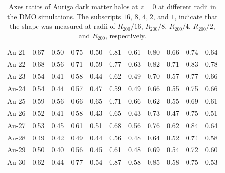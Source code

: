 \documentclass[usenatbib]{mnras}
\begin{document}
\begin{table}
\begin{tabular}{c c c c c c c c c c c}
Au-21 & 0.67 & 0.50 & 0.75 & 0.50 & 0.81 & 0.61 & 0.80 & 0.66 & 0.74 & 0.64\\
Au-22 & 0.68 & 0.56 & 0.71 & 0.59 & 0.77 & 0.63 & 0.82 & 0.71 & 0.83 & 0.78\\
Au-23 & 0.54 & 0.41 & 0.58 & 0.44 & 0.62 & 0.49 & 0.70 & 0.57 & 0.77 & 0.66\\
Au-24 & 0.54 & 0.44 & 0.57 & 0.47 & 0.59 & 0.49 & 0.66 & 0.55 & 0.75 & 0.66\\
Au-25 & 0.59 & 0.56 & 0.66 & 0.65 & 0.71 & 0.66 & 0.62 & 0.55 & 0.69 & 0.61\\
Au-26 & 0.52 & 0.41 & 0.58 & 0.43 & 0.65 & 0.43 & 0.73 & 0.47 & 0.75 & 0.51\\
Au-27 & 0.53 & 0.45 & 0.61 & 0.51 & 0.68 & 0.56 & 0.76 & 0.62 & 0.84 & 0.64\\
Au-28 & 0.49 & 0.42 & 0.49 & 0.44 & 0.56 & 0.48 & 0.64 & 0.52 & 0.74 & 0.58\\
Au-29 & 0.50 & 0.40 & 0.56 & 0.45 & 0.61 & 0.48 & 0.69 & 0.54 & 0.72 & 0.60\\
Au-30 & 0.62 & 0.44 & 0.77 & 0.54 & 0.87 & 0.58 & 0.85 & 0.58 & 0.75 & 0.53\\
  \hline\hline
  \end{tabular}
  \caption{Axes ratios of Auriga dark matter halos at $z=0$ at
    different radii in the DMO simulations. The subscripts $16$, $8$, $4$, $2$, and $1$,
    indicate that the shape was measured at radii of $R_{200}/16$,
    $R_{200}/8$, $R_{200}/4$, $R_{200}/2$, and $R_{200}$, respectively.   \label{table:DMO}}
\end{table}
\end{document}
